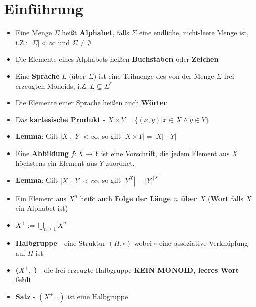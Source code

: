 \documentclass[12pt, a4paper]{article}
\begin{document}
	\section{Einführung}
	\begin{itemize}
		\item Eine Menge $\Sigma$ heißt \textbf{Alphabet}, falls $\Sigma$ eine endliche, nicht-leere Menge ist, i.Z.: $|\Sigma|<\infty$ und $\Sigma\neq\emptyset$
		
		\item Die Elemente eines Alphabets heißen \textbf{Buchstaben} oder \textbf{Zeichen}
		
		\item Eine \textbf{Sprache} $L$ (über $\Sigma$) ist eine Teilmenge des von der Menge $\Sigma$ frei erzeugten Monoids, i.Z.:$L\subseteq\Sigma^{*}$
		
		\item Die Elemente einer Sprache heißen auch \textbf{Wörter}
		
		\item Das \textbf{kartesische Produkt} - $X\times Y=\{(x,y)|x\in X\wedge y\in Y\}$
		
		\item \textbf{Lemma}: Gilt $|X|,|Y|<\infty$, so gilt $|X\times Y|=|X|\cdot|Y|$
		
		\item Eine \textbf{Abbildung} $f:X\rightarrow Y$ ist eine Vorschrift, die jedem Element aus $X$ höchstens ein Element aus $Y$ zuordnet.
		
		\item \textbf{Lemma}: Gilt $|X|,|Y|<\infty$, so gilt $|Y^{X}|=|Y|^{|X|}$
		
		\item Ein Element aus $X^{n}$ heißt auch \textbf{Folge der Länge $n$ über $X$} (\textbf{Wort} falls $X$ ein Alphabet ist)
		
		\item \textbf{\textbf{$X^{+}$}}$:= \bigcup_{n\geq1}X^{n}$
		
		\item \textbf{Halbgruppe} - eine Struktur $(H,\circ)$ wobei $\circ$ eine assoziative Verknüpfung auf $H$ ist
		
		\item \textbf{($X^{+},\cdot$)} - die frei erzeugte Halbgruppe \textbf{KEIN MONOID, leeres Wort fehlt}
		
		\item \textbf{Satz} - $(X^{+},\cdot)$ ist eine Halbgruppe
		

\end{itemize}
\end{document}

